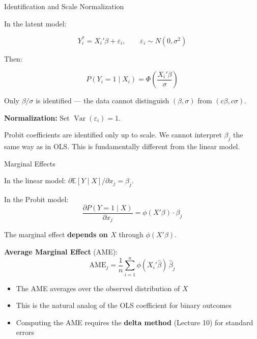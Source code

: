 \documentclass[aspectratio=169]{beamer}
\numberwithin{equation}{section}
\begin{document}

\begin{frame}{Identification and Scale Normalization}

In the latent model:

\[
Y_i^* = X_i'\beta + \varepsilon_i, \qquad \varepsilon_i \sim N(0,\sigma^2)
\]

\pause

Then:

\[
P(Y_i=1 \mid X_i)
=
\Phi\left(\frac{X_i'\beta}{\sigma}\right)
\]

\pause

Only $\beta/\sigma$ is identified --- the data cannot distinguish $(\beta, \sigma)$ from $(c\beta, c\sigma)$.

\pause

\textbf{Normalization:} Set $\operatorname{Var}(\varepsilon_i) = 1$.

\pause

\begin{tcolorbox}[colback=blue!5, colframe=blue!50, title=Key Point]
Probit coefficients are identified only up to scale. We cannot interpret $\beta_j$ the same way as in OLS. This is fundamentally different from the linear model.
\end{tcolorbox}

\end{frame}


\begin{frame}{Marginal Effects}

In the linear model: $\partial \mathbb{E}[Y \mid X]/\partial x_j = \beta_j$.

\pause

In the Probit model:
\[
\frac{\partial P(Y=1 \mid X)}{\partial x_j}
=
\phi(X'\beta) \cdot \beta_j
\]

\pause

The marginal effect \textbf{depends on $X$} through $\phi(X'\beta)$.

\pause

\bigskip

\textbf{Average Marginal Effect} (AME):
\[
\widehat{\text{AME}}_j = \frac{1}{n}\sum_{i=1}^n \phi(X_i'\hat\beta)\,\hat\beta_j
\]

\pause

\begin{itemize}
    \item The AME averages over the observed distribution of $X$
    \item This is the natural analog of the OLS coefficient for binary outcomes
    \item Computing the AME requires the \textbf{delta method} (Lecture 10) for standard errors
\end{itemize}

\end{frame}
\end{document}
